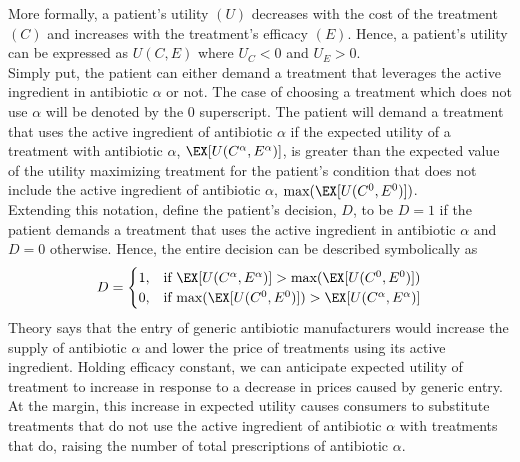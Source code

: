 \indent More formally, a patient's utility $(U)$ decreases with the cost of the treatment $(C)$ and increases with the treatment's efficacy $(E)$. Hence, a patient's utility can be expressed as $U(C,E)$ where $U_C < 0$ and $U_E > 0$.\\
\indent Simply put, the patient can either demand a treatment that leverages the active ingredient in antibiotic $\alpha$ or not. The case of choosing a treatment which does not use $\alpha$ will be denoted by the $0$ superscript. The patient will demand a treatment that uses the active ingredient of antibiotic $\alpha$ if the expected utility of a treatment with antibiotic $\alpha$, $\EX[U(C^\alpha,E^\alpha)]$, is greater than the expected value of the utility maximizing treatment for the patient's condition that does not include the active ingredient of antibiotic $\alpha$, $\text{max}(\EX[U(C^0,E^0)])$.\\
Extending this notation, define the patient's decision, $D$, to be $D=1$ if the patient demands a treatment that uses the active ingredient in antibiotic $\alpha$ and $D=0$ otherwise. Hence, the entire decision can be described symbolically as
\begin{eqnarray}
  D =
  \begin{cases}
    1, & \text{if }\EX[U(C^\alpha,E^\alpha)] > \text{max}(\EX[U(C^0,E^0)]) \\
    0, & \text{if }\text{max}(\EX[U(C^0,E^0)]) > \EX[U(C^\alpha,E^\alpha)] \\
  \end{cases}
\end{eqnarray}
\indent Theory says that the entry of generic antibiotic manufacturers would increase the supply of antibiotic $\alpha$ and lower the price of treatments using its active ingredient. Holding efficacy constant, we can anticipate expected utility of treatment to increase in response to a decrease in prices caused by generic entry. At the margin, this increase in expected utility causes consumers to substitute treatments that do not use the active ingredient of antibiotic $\alpha$ with treatments that do, raising the number of total prescriptions of antibiotic $\alpha$.

